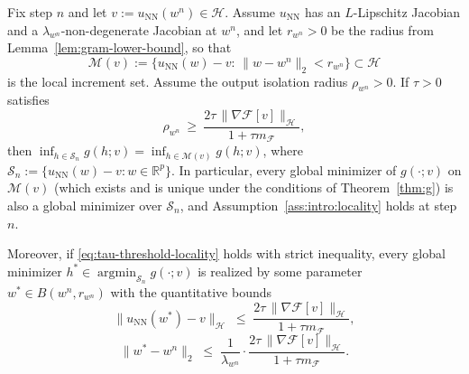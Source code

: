 \documentclass[twoside,11pt]{article}
\newcommand{\R}{\mathbb{R}}
\newcommand{\NN}{\mathrm{NN}}
\newcommand{\argmin}{\mathop{\mathrm{arg min}}}
\newcommand{\calF}{\mathcal{F}}
\newcommand{\calH}{\mathcal{H}}
\newcommand{\calM}{\mathcal{M}}
\begin{document}
\begin{theorem}\label{thm:small-tau-locality}
Fix step $n$ and let $v:=u_\NN(w^n)\in\calH$. Assume $u_\NN$ has an $L$-Lipschitz Jacobian and a $\lambda_{w^n}$-non-degenerate Jacobian at $w^n$, and let $r_{w^n}>0$ be the radius from Lemma~\ref{lem:gram-lower-bound}, so that
\[
\calM(v):=\{u_\NN(w)-v:\,\|w-w^n\|_2 < r_{w^n}\}\subset\calH
\]
is the local increment set. Assume the output isolation radius $\rho_{w^n}>0$.
If $\tau>0$ satisfies
\begin{equation}\label{eq:tau-threshold-locality}
\rho_{w^n}\ \ge\ \frac{2\tau\,\|\nabla\calF[v]\|_\calH}{1+\tau m_\calF},
\end{equation}
then $\inf_{h\in\mathcal{S}_n}g(h;v)=\inf_{h\in\calM(v)}g(h;v)$, where $\mathcal{S}_n:=\{u_\NN(w)-v:w\in\R^p\}$. In particular, every global minimizer of $g(\cdot;v)$ on $\calM(v)$ (which exists and is unique under the conditions of Theorem~\ref{thm:g}) is also a global minimizer over $\mathcal{S}_n$, and Assumption~\ref{ass:intro:locality} holds at step $n$.

\smallskip
\noindent
Moreover, if \eqref{eq:tau-threshold-locality} holds with strict inequality, every global minimizer $h^*\in\argmin_{\mathcal{S}_n}g(\cdot;v)$ is realized by some parameter $w^*\in B(w^n,r_{w^n})$ with the quantitative bounds
\begin{equation}\label{eq:k-bound-thm}
\|u_\NN(w^*)-v\|_\calH\;\le\;\frac{2\tau\,\|\nabla\calF[v]\|_\calH}{1+\tau m_\calF},
\end{equation}
\begin{equation}\label{eq:w-bound-thm}
\|w^*-w^n\|_2\;\le\;\frac{1}{\lambda_{w^n}}\cdot\frac{2\tau\,\|\nabla\calF[v]\|_\calH}{1+\tau m_\calF}.
\end{equation}
\end{theorem}
\end{document}
